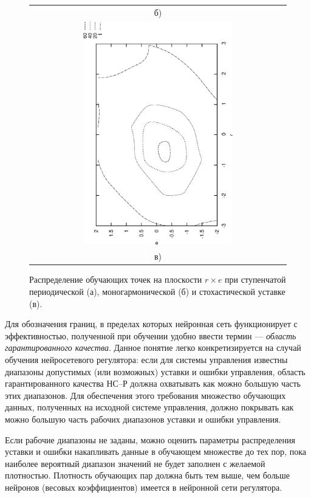 \begin{figure}
\begin{tabular}{c}
б)\\
\includegraphics[angle=270,width=0.6\textwidth,%
  totalheight=0.25\textheight]{stoch_re2d}\\
в)\\
\end{tabular}
\caption{Распределение обучающих точек на плоскости $r\times e$
         при ступенчатой периодической (а), моногармонической (б) и
         стохастической уставке (в).}%
\label{fig:probe_signals_re2d}
\end{figure}

Для обозначения границ, в пределах которых нейронная сеть
функционирует с эффективностью, полученной при обучении удобно ввести
термин --- {\em область гарантированного качества}.  Данное понятие
легко конкретизируется на случай обучения нейросетевого регулятора:
если для системы управления известны диапазоны допустимых (или
возможных) уставки и ошибки управления, область гарантированного
качества НС--Р должна охватывать как можно большую часть этих
диапазонов.  Для обеспечения этого требования множество обучающих
данных, полученных на исходной системе управления, должно покрывать
как можно большую часть рабочих диапазонов уставки и ошибки
управления.

Если рабочие диапазоны не заданы, можно оценить параметры
распределения уставки и ошибки накапливать данные в обучающем
множестве до тех пор, пока наиболее вероятный диапазон значений не
будет заполнен с желаемой плотностью.  Плотность обучающих пар должна
быть тем выше, чем больше нейронов (весовых коэффициентов) имеется в
нейронной сети регулятора.


